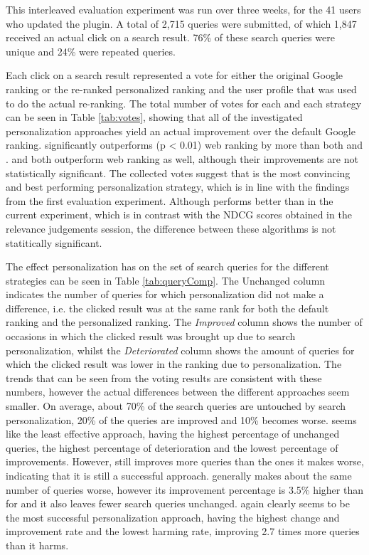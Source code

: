 \documentclass{sig-alternate}
\begin{document}
This interleaved evaluation experiment was run over three weeks, for the 41 users who updated the plugin. A total of 2,715 queries were submitted, of which 1,847 received an actual click on a search result. 76\% of these search queries were unique and 24\% were repeated queries.

Each click on a search result represented a vote for either the original Google ranking or the re-ranked personalized ranking and the user profile that was used to do the actual re-ranking. The total number of votes for each and each strategy can be seen in Table \ref{tab:votes}, showing that all of the investigated personalization approaches yield an actual improvement over the default Google ranking. \MaxNDCG significantly outperforms (p < 0.01) web ranking by more than both \MaxQuer and \MaxBestPar. \MaxQuer and \MaxBestPar both outperform web ranking as well, although their improvements are not statistically significant. The collected votes suggest that \MaxNDCG is the most convincing and best performing personalization strategy, which is in line with the findings from the first evaluation experiment. Although \MaxBestPar performs better than \MaxQuer in the current experiment, which is in contrast with the NDCG scores obtained in the relevance judgements session, the difference between these algorithms is not statitically significant.

The effect personalization has on the set of search queries for the different strategies can be seen in Table \ref{tab:queryComp}. The Unchanged column indicates the number of queries for which personalization did not make a difference, i.e. the clicked result was at the same rank for both the default ranking and the personalized ranking. The \emph{Improved} column shows the number of occasions in which the clicked result was brought up due to search personalization, whilst the \emph{Deteriorated} column shows the amount of queries for which the clicked result was lower in the ranking due to personalization. The trends that can be seen from the voting results are consistent with these numbers, however the actual differences between the different approaches seem smaller. On average, about 70\% of the search queries are untouched by search personalization, 20\% of the queries are improved and 10\% becomes worse. \MaxQuer seems like the least effective approach, having the highest percentage of unchanged queries, the highest percentage of deterioration and the lowest percentage of improvements. However, \MaxQuer still improves more queries than the ones it makes worse, indicating that it is still a successful approach. \MaxBestPar generally makes about the same number of queries worse, however its improvement percentage is 3.5\% higher than for \MaxQuer and it also leaves fewer search queries unchanged. \MaxNDCG again clearly seems to be the most successful personalization approach, having the highest change  and improvement rate and the lowest harming rate, improving 2.7 times more queries than it harms.
\end{document}
